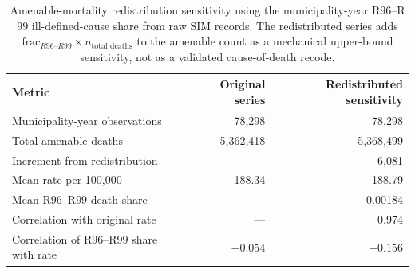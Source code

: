 \begin{table}[h!]
\centering
\caption{Amenable-mortality redistribution sensitivity using the municipality-year R$96$--R$99$ ill-defined-cause share from raw SIM records. The redistributed series adds $\text{frac}_{R96\text{--}R99}\times n_{\text{total deaths}}$ to the amenable count as a mechanical upper-bound sensitivity, not as a validated cause-of-death recode.}
\label{tab:amenable-sensitivity}
\small
\begin{tabular}{lrr}
\toprule
Metric & Original series & Redistributed sensitivity \\
\midrule
Municipality-year observations & 78{,}298 & 78{,}298 \\
Total amenable deaths & 5{,}362{,}418 & 5{,}368{,}499 \\
Increment from redistribution & --- & 6{,}081 \\
Mean rate per 100{,}000 & 188.34 & 188.79 \\
Mean R$96$--R$99$ death share & --- & 0.00184 \\
Correlation with original rate & --- & 0.974 \\
Correlation of R$96$--R$99$ share with rate & $-0.054$ & $+0.156$ \\
\bottomrule
\end{tabular}
\end{table}
